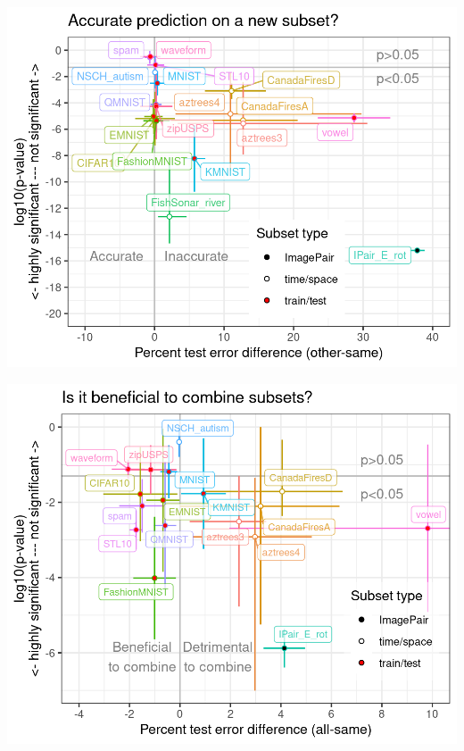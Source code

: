 \documentclass[t]{beamer}
\begin{document}
\begin{frame}
\end{frame}

\begin{frame}
  \includegraphics[height=\textheight]{data_Classif_batchmark_registry_scatter_other_segments.png} 
\end{frame}
 
\begin{frame}
  \includegraphics[height=\textheight]{data_Classif_batchmark_registry_scatter_all_segments.png}
\end{frame}
 
\end{document}

